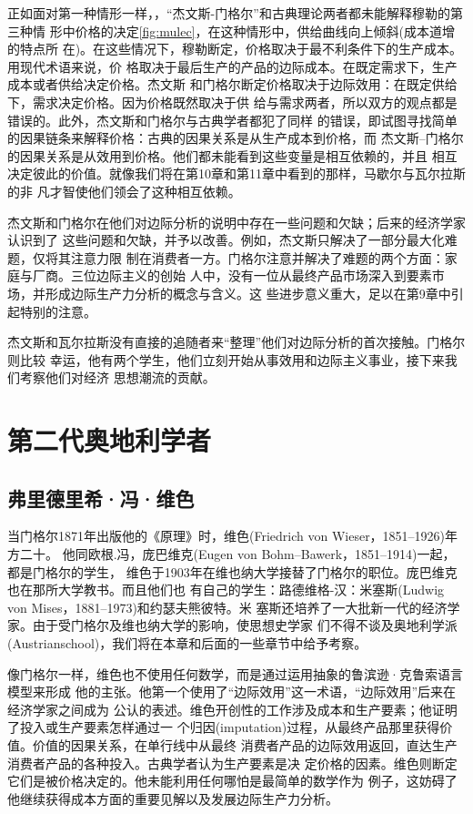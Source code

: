 正如面对第一种情形一样，，“杰文斯-门格尔”和古典理论两者都未能解释穆勒的第三种情
形中价格的决定\cref{fig:mulec}，在这种情形中，供给曲线向上倾斜(成本道增的特点所
在)。在这些情况下，穆勒断定，价格取决于最不利条件下的生产成本。用现代术语来说，价
格取决于最后生产的产品的边际成本。在既定需求下，生产成本或者供给决定价格。杰文斯
和门格尔断定价格取决于边际效用：在既定供给下，需求决定价格。因为价格既然取决于供
给与需求两者，所以双方的观点都是错误的。此外，杰文斯和门格尔与古典学者都犯了同样
的错误，即试图寻找简单的因果链条来解释价格：古典的因果关系是从生产成本到价格，而
杰文斯--门格尔的因果关系是从效用到价格。他们都未能看到这些变量是相互依赖的，并且
相互决定彼此的价值。就像我们将在第10章和第11章中看到的那样，马歇尔与瓦尔拉斯的非
凡才智使他们领会了这种相互依赖。

杰文斯和门格尔在他们对边际分析的说明中存在一些问题和欠缺；后来的经济学家认识到了
这些问题和欠缺，并予以改善。例如，杰文斯只解决了一部分最大化难题，仅将其注意力限
制在消费者一方。门格尔注意并解决了难题的两个方面：家庭与厂商。三位边际主义的创始
人中，没有一位从最终产品市场深入到要素市场，并形成边际生产力分析的概念与含义。这
些进步意义重大，足以在第9章中引起特别的注意。

杰文斯和瓦尔拉斯没有直接的追随者来“整理”他们对边际分析的首次接触。门格尔则比较
幸运，他有两个学生，他们立刻开始从事效用和边际主义事业，接下来我们考察他们对经济
思想潮流的贡献。

\section{第二代奥地利学者}

\subsection{弗里德里希·冯·维色}

当门格尔1871年出版他的《原理》时，维色(Friedrich von Wieser，1851--1926)年方二十。
他同欧根.冯，庞巴维克(Eugen von Bohm--Bawerk，1851--1914)一起，都是门格尔的学生，
维色于1903年在维也纳大学接替了门格尔的职位。庞巴维克也在那所大学教书。而且他们也
有自己的学生：路德维格-汉：米塞斯(Ludwig von Mises，1881--1973)和约瑟夫熊彼特。米
塞斯还培养了一大批新一代的经济学家。由于受门格尔及维也纳大学的影响，使思想史学家
们不得不谈及奥地利学派(Austrianschool)，我们将在本章和后面的一些章节中给予考察。

像门格尔一样，维色也不使用任何数学，而是通过运用抽象的鲁滨逊·克鲁索语言模型来形成
他的主张。他第一个使用了“边际效用”这一术语，“边际效用”后来在经济学家之间成为
公认的表述。维色开创性的工作涉及成本和生产要素；他证明了投入或生产要素怎样通过一
个归因(imputation)过程，从最终产品那里获得价值。价值的因果关系，在单行线中从最终
消费者产品的边际效用返回，直达生产消费者产品的各种投入。古典学者认为生产要素是决
定价格的因素。维色则断定它们是被价格决定的。他未能利用任何哪怕是最简单的数学作为
例子，这妨碍了他继续获得成本方面的重要见解以及发展边际生产力分析。


